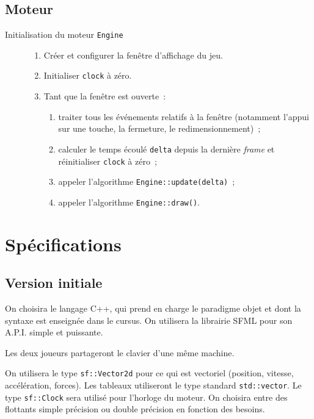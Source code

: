 \subsection{Moteur}

\begin{description}
    \item[Initialisation du moteur \texttt{Engine}]\hfill
    \begin{enumerate}
        \item Créer et configurer la fenêtre d'affichage du jeu.
        \item Initialiser \texttt{clock} à zéro.
        \item Tant que la fenêtre est ouverte~:
        \begin{enumerate}
            \item traiter tous les événements relatifs à la fenêtre
            (notamment l'appui sur une touche, la fermeture, le redimensionnement)~;
            \item calculer le temps écoulé \texttt{delta} depuis la
            dernière \emph{frame} et réinitialiser \texttt{clock} à zéro~;
            \item appeler l'algorithme \texttt{Engine::update(delta)}~;
            \item appeler l'algorithme \texttt{Engine::draw()}.
        \end{enumerate}
    \end{enumerate}
\end{description}

\section{Spécifications}

\subsection{Version initiale}

On choisira le langage C++, qui prend en charge le paradigme objet
et dont la syntaxe est enseignée dans le cursus. On utilisera
la librairie SFML pour son A.P.I. simple et puissante.

Les deux joueurs partageront le clavier d'une même machine.

On utilisera le type \texttt{sf::Vector2d} pour ce qui est
vectoriel (position, vitesse, accélération, forces). Les tableaux
utiliseront le type standard \texttt{std::vector}. Le type
\texttt{sf::Clock} sera utilisé pour l'horloge du moteur. On choisira
entre des flottants simple précision ou double précision en
fonction des besoins.

